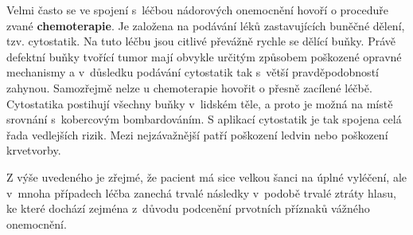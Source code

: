 Velmi často se ve spojení s~léčbou nádorových onemocnění hovoří o proceduře zvané
\textbf{chemoterapie}. Je založena na podávání léků zastavujících buněčné
dělení, tzv. cytostatik. %
Na tuto léčbu jsou citlivé převážně rychle se dělící buňky.
Právě defektní buňky tvořící tumor mají obvykle určitým způsobem poškozené opravné
mechanismy a v~důsledku podávání cytostatik tak s~větší pravděpodobností
zahynou. Samozřejmě nelze u chemoterapie hovořit o přesně zacílené léčbě.
Cytostatika postihují všechny buňky v~lidském těle, a proto je možná na místě
srovnání s~kobercovým bombardováním. S aplikací cytostatik je tak
spojena celá řada vedlejších rizik. Mezi nejzávažnější patří poškození ledvin
nebo poškození krvetvorby.


Z výše uvedeného je zřejmé, že pacient má sice velkou šanci na úplné
vyléčení, ale v~mnoha případech léčba zanechá trvalé následky v~podobě trvalé ztráty
hlasu, ke které dochází zejména z~důvodu podcenění prvotních příznaků vážného onemocnění.


